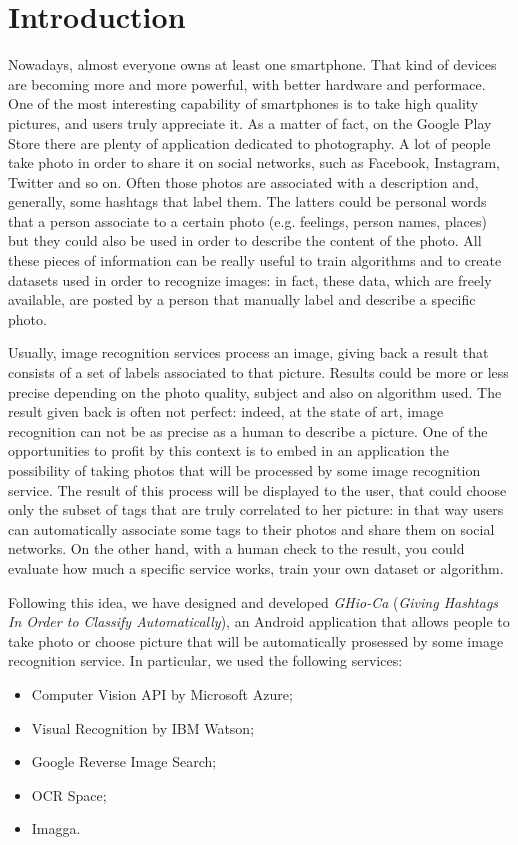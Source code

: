 \section{Introduction}


Nowadays, almost everyone owns at least one smartphone. That kind of devices are becoming more and more powerful, with better hardware and performace. One of the most interesting capability of smartphones is to take high quality pictures, and users truly appreciate it. As a matter of fact, on the Google Play Store there are plenty of application dedicated to photography.
A lot of people take photo in order to share it on social networks, such as Facebook, Instagram, Twitter and so on. Often those photos are associated with a description and, generally, some hashtags that label them. The latters could be personal words that a person associate to a certain photo (e.g. feelings, person names, places) but they could also be used in order to describe the content of the photo.
All these pieces of information can be really useful to train algorithms and to create datasets used in order to recognize images: in fact, these data, which are freely available, are posted by a person that manually label and describe a specific photo.

Usually, image recognition services process an image, giving back a result that consists of a set of labels associated to that picture. Results could be more or less precise depending on the photo quality, subject and also on algorithm used. The result given back is often not perfect: indeed, at the state of art, image recognition can not be as precise as a human to describe a picture.
One of the opportunities to profit by this context is to embed in an application the possibility of taking photos that will be processed by some image recognition service. The result of this process will be displayed to the user, that could choose only the subset of tags that are truly correlated to her picture: in that way users can automatically associate some tags to their photos and share them on
social networks. On the other hand, with a human check to the result, you could evaluate how much a specific service works, train your own dataset or algorithm. 

Following this idea, we have designed and developed \textit{GHio-Ca} (\textit{Giving Hashtags In Order to Classify Automatically}), an Android application that allows people to take photo or choose picture that will be automatically prosessed by some image recognition service. In particular, we used the following services:
\begin{itemize}
	\item Computer Vision API by Microsoft Azure\cite{Microsoft};
	\item Visual Recognition by IBM Watson\cite{IBM};
	\item Google Reverse Image Search\cite{Google};
	\item OCR Space\cite{OCR};
	\item Imagga\cite{Imagga}.
\end{itemize}

